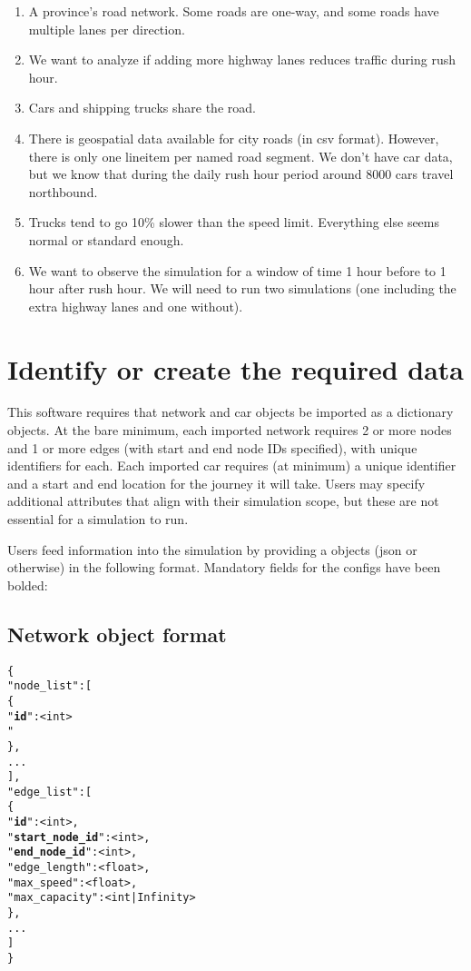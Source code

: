\begin{enumerate}
    \item A province's road network.  Some roads are one-way, and some roads have multiple lanes per direction.
    \item  We want to analyze if adding more highway lanes reduces traffic during rush hour.
    \item Cars and shipping trucks share the road.
    \item There is geospatial data available for city roads (in csv format).  However, there is only one lineitem per named road segment.  We don't have car data, but we know that during the daily rush hour period around 8000 cars travel northbound.
    \item Trucks tend to go 10\% slower than the speed limit.  Everything else seems normal or standard enough. 
    \item We want to observe the simulation for a window of time 1 hour before to 1 hour after rush hour.  We will need to run two simulations (one including the extra highway lanes and one without).
\end{enumerate}


\section{Identify or create the required data}

\par This software requires that network and car objects be imported as a dictionary objects.  At the bare minimum, each imported network requires 2 or more nodes and 1 or more edges (with start and end node IDs specified), with unique identifiers for each.  Each imported car requires (at minimum) a unique identifier and a start and end location for the journey it will take. Users may specify additional attributes that align with their simulation scope, but these are not essential for a simulation to run. \\

\par Users feed information into the simulation by providing a objects (json or otherwise) in the following format.  Mandatory fields for the configs have been bolded:

\subsection{Network object format}

\begin{alltt}
\{
    "node_list": [
        \{
            "\textbf{id}": <int>
            "
        \},
        ...
    ],
    "edge_list": [
        \{
            "\textbf{id}": <int>,
            "\textbf{start_node_id}": <int>,
            "\textbf{end_node_id}": <int>,
            "edge_length": <float>,
            "max_speed": <float>,
            "max_capacity": <int | Infinity>
        \},
        ...
    ]
\}
\end{alltt}


